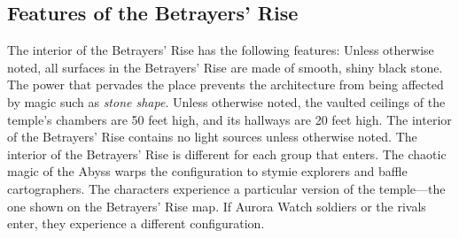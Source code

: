 \documentclass[10pt,a4,twoside,twocolumn,openany,nodeprecatedcode]{dndbook}
\begin{document}
\subsection{Features of the Betrayers' Rise}
The interior of the Betrayers' Rise has the following features:
{{Unless otherwise noted, all surfaces in the Betrayers' Rise are made of smooth, shiny black stone. The power that pervades the place prevents the architecture from being affected by magic such as \textit{stone shape}.}}
{{Unless otherwise noted, the vaulted ceilings of the temple's chambers are 50 feet high, and its hallways are 20 feet high.}}
{{The interior of the Betrayers' Rise contains no light sources unless otherwise noted.}}
{{The interior of the Betrayers' Rise is different for each group that enters. The chaotic magic of the Abyss warps the configuration to stymie explorers and baffle cartographers. The characters experience a particular version of the temple—the one shown on the Betrayers' Rise map. If Aurora Watch soldiers or the rivals enter, they experience a different configuration.}}
\end{document}
